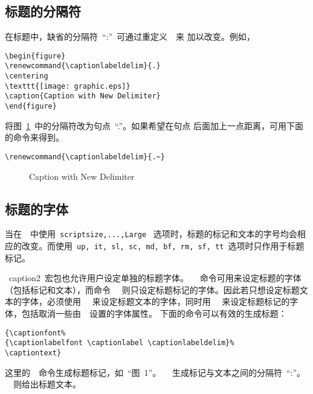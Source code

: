 \subsection{标题的分隔符}

在标题中，缺省的分隔符~``:''~可通过重定义~~来
加以改变。例如，
\begin{Verbatim}[xleftmargin=1cm]
\begin{figure} 
\renewcommand{\captionlabeldelim}{.} 
\centering 
\texttt{[image: graphic.eps]} 
\caption{Caption with New Delimiter} 
\end{figure}
\end{Verbatim}
将图~\ref{fig:newdelim}~中的分隔符改为句点~``.''。如果希望在句点
后面加上一点距离，可用下面的命令来得到。
\begin{Verbatim}[xleftmargin=1cm]
\renewcommand{\captionlabeldelim}{.~}
\end{Verbatim}

\begin{figure} 
	\renewcommand{\captionlabeldelim}{.} 
	\centering 
	\resizebox{2in}{!}{\usebox{\graphic}}
	\caption{Caption with New Delimiter}\label{fig:newdelim}
\end{figure}

\subsection{标题的字体}

当在~~中使用~\texttt{scriptsize,...,Large}~
选项时，标题的标记和文本的字号均会相应的改变。而使用~\texttt{up, it, sl,
	sc, md, bf, rm, sf, tt}~选项时只作用于标题标记。

~\textsf{caption2}~宏包也允许用户设定单独的标题字体。~~
命令可用来设定标题的字体（包括标记和文本），而命令~~
则只设定标题标记的字体。因此若只想设定标题文本的字体，必须使用
~~来设定标题文本的字体，同时用~~
来设定标题标记的字体，包括取消一些由~~设置的字体属性。
下面的命令可以有效的生成标题：
\begin{Verbatim}[xleftmargin=1cm]
{\captionfont% 
{\captionlabelfont \captionlabel \captionlabeldelim}% 
\captiontext}
\end{Verbatim}
这里的~~命令生成标题标记，如~``{图~1}''。
~~生成标记与文本之间的分隔符~``:''。
~~则给出标题文本。

